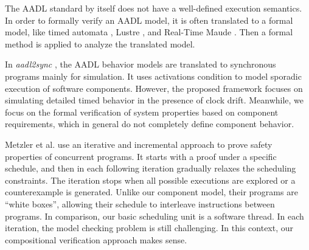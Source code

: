 The AADL standard by itself does not have a well-defined execution semantics. In order to formally verify an AADL model, it is often translated to a formal model, like timed automata \cite{behaviorAnnex}, Lustre \cite{AADL2Sync}, and Real-Time Maude \cite{maude}. Then a formal method is applied to analyze the translated model.  \cite{CoCoSpec}

In \emph{aadl2sync} \cite{AADL2Sync}, the AADL behavior models are translated to synchronous programs mainly for simulation. It uses activations condition to model sporadic execution of software components. However, the proposed framework focuses on simulating detailed timed behavior in the presence of clock drift. Meanwhile, we focus on the formal verification of system properties based on component requirements, which in general do not completely define component behavior.

Metzler et al. \cite{Metzler2020} use an iterative and incremental approach to prove safety properties of concurrent programs. It starts with a proof under a specific schedule, and then in each following iteration gradually relaxes the scheduling constraints. The iteration stops when all possible executions are explored or a counterexample is generated. Unlike our component model, their programs are ``white boxes'', allowing their schedule to interleave instructions between programs. In comparison, our basic scheduling unit is a software thread. In each iteration, the model checking problem is still challenging. In this context, our compositional verification approach makes sense.

